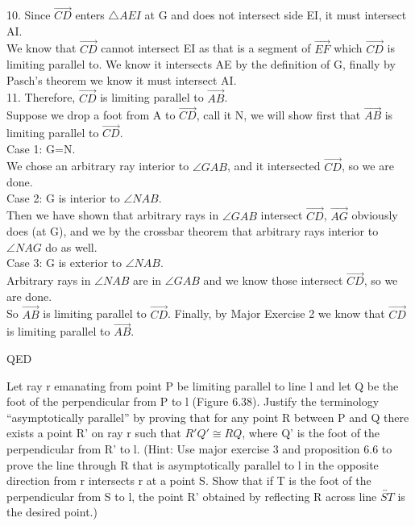 \documentclass[12pt,letterpaper]{article}
\newcommand{\QED}{\begin{flushright}QED\end{flushright}}
\newcommand{\prob}[1]{\newpage\noindent {\bf #1}}
\begin{document}
10.  Since $\overrightarrow{CD}$ enters $\triangle AEI$ at G and does not intersect side EI, it must intersect AI.\\

We know that $\overrightarrow{CD}$ cannot intersect EI as that is a segment of $\overrightarrow{EF}$ which $\overrightarrow{CD}$ is limiting parallel to. We know it intersects AE by the definition of G, finally by Pasch's theorem we know it must intersect AI.\\



11. Therefore, $\overrightarrow{CD}$ is limiting parallel to $\overrightarrow{AB}$. \\

Suppose we drop a foot from A to $\overrightarrow{CD}$, call it N, we will show first that $\overrightarrow{AB}$ is limiting parallel to $\overrightarrow{CD}$.  \\

Case 1: G=N.\\

We chose an arbitrary ray interior to $\angle GAB$, and it intersected $\overrightarrow{CD}$, so we are done.\\

Case 2: G is interior to $\angle NAB$.\\

Then we have shown that arbitrary rays in $\angle GAB$ intersect $\overrightarrow{CD}$, $\overrightarrow{AG}$ obviously does (at G), and we by the crossbar theorem that arbitrary rays interior to $\angle NAG$ do as well.\\

Case 3: G is exterior to $\angle NAB$. \\

Arbitrary rays in $\angle NAB$ are in $\angle GAB$ and we know those intersect $\overrightarrow{CD}$, so we are done.\\

So $\overrightarrow{AB}$ is limiting parallel to $\overrightarrow{CD}$.  Finally, by Major Exercise 2 we know that $\overrightarrow{CD}$ is limiting parallel to $\overrightarrow{AB}$.

\QED


\prob{Major Exercises 11 } Let ray r emanating from point P be limiting parallel to line l and let Q be the foot of the perpendicular from P to l (Figure 6.38).  Justify the terminology ``asymptotically parallel'' by proving that for any point R between P and Q there exists a point R' on ray r such that $R'Q' \cong RQ$, where Q' is the foot of the perpendicular from R' to l.  (Hint: Use major exercise 3 and proposition 6.6 to prove the line through R that is asymptotically parallel to l in the opposite direction from r intersects r at a point S.  Show that if T is the foot of the perpendicular from S to l, the point R' obtained by reflecting R across line $\overleftrightarrow{ST}$ is the desired point.)\\
\end{document}
